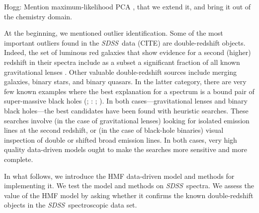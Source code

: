 \documentclass[12pt,preprint]{aastex}
\newcommand{\project}[1]{\textsl{#1}}
\newcommand{\sdss}{\project{SDSS}}
\begin{document}
Hogg: Mention maximum-likelihood PCA \citep{mlpca}, that we extend it,
and bring it out of the chemistry domain.

At the beginning, we mentioned outlier identification.  Some of the
most important outliers found in the \sdss\ data (CITE) are
double-redshift objects.  Indeed, the set of luminous red galaxies
that show evidence for a second (higher) redshift in their spectra
include as a subset a significant fraction of all known gravitational
lenses \citep{bolton}.  Other valuable double-redshift sources include merging
galaxies, binary stars, and binary quasars.  In the latter category,
there are very few known examples where the best explanation for a
spectrum is a bound pair of super-massive black holes (\citealp{komossa}; 
\citealp{shields}: \citealp{boroson}; \citealp{decarli}).  In both
cases---gravitational lenses and binary black holes---the best
candidates have been found with heuristic searches.  These searches
involve (in the case of gravitational lenses) looking for isolated
emission lines at the second redshift, or (in the case of black-hole
binaries) visual inspection of double or shifted broad emission lines.
In both cases, very high quality data-driven models ought to make the
searches more sensitive and more complete.

In what follows, we introduce the HMF data-driven model and methods
for implementing it.  We test the model and methods on \sdss\ spectra.
We assess the value of the HMF model by asking whether it confirms the
known double-redshift objects in the \sdss\ spectroscopic data set.
\end{document}
